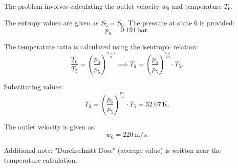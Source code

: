 The problem involves calculating the outlet velocity \( w_6 \) and temperature \( T_6 \).  

The entropy values are given as \( S_5 = S_6 \). The pressure at state 6 is provided:  
\[
p_6 = 0.191 \, \text{bar}.
\]  

The temperature ratio is calculated using the isentropic relation:  
\[
\frac{T_6}{T_5} = \left(\frac{p_6}{p_5}\right)^{\frac{n-1}{n}} \implies T_6 = \left(\frac{p_6}{p_5}\right)^{\frac{0.4}{1.4}} \cdot T_5.
\]  

Substituting values:  
\[
T_6 = \left(\frac{p_6}{p_5}\right)^{\frac{0.4}{1.4}} \cdot T_5 = 32.07 \, \text{K}.
\]  

The outlet velocity is given as:  
\[
w_6 = 220 \, \text{m/s}.
\]  

Additional note: "Durchschnitt Dose" (average value) is written near the temperature calculation.
